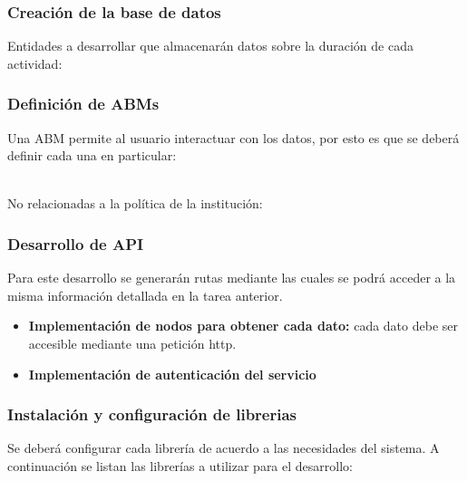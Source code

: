 \documentclass{article}
\begin{document}
\subsubsection{Creación de la base de datos}%
\label{ssub:creación_de_la_base_de_datos}

Entidades a desarrollar que almacenarán datos  sobre la duración de cada actividad:

\begin{itemize}
    
\end{itemize}

\subsubsection{Definición de ABMs}%
\label{ssub:definición_de_abms}


Una ABM permite al usuario interactuar con los datos, por esto es que se deberá definir cada una en particular:

\begin{itemize}
    
\end{itemize}
\ \\No relacionadas a la política de la institución:
\begin{itemize}
    
\end{itemize}

\subsubsection{Desarrollo de API }%
\label{ssub:desarrollo_de_api_}
Para este desarrollo se generarán rutas mediante las cuales se podrá acceder a la misma información detallada en la tarea anterior.

\begin{itemize}
    \item \textbf{Implementación de nodos para obtener cada dato:} cada dato debe ser accesible mediante una petición http.
    \item \textbf{Implementación de autenticación del servicio}
\end{itemize}

\subsubsection{Instalación y configuración de librerias}%
\label{ssub:instalación_y_configuración_de_librerias}
Se deberá configurar cada librería de acuerdo a las necesidades del sistema.
A continuación se listan las librerías a utilizar para el desarrollo:
\end{document}
